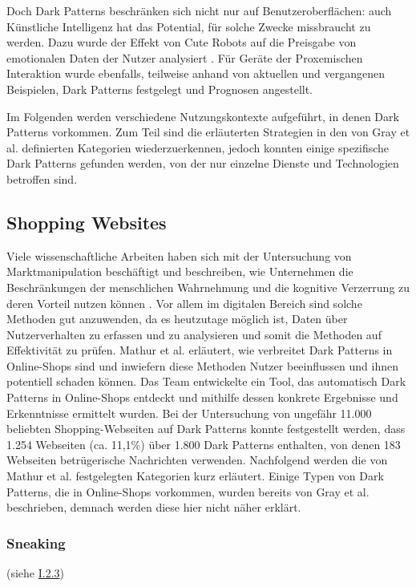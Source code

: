 \documentclass[a4paper]{article}
\begin{document}
Doch Dark Patterns beschränken sich nicht nur auf Benutzeroberflächen: auch Künstliche Intelligenz hat das Potential, für solche Zwecke missbraucht zu werden. Dazu wurde
der Effekt von \glqq Cute Robots\grqq{} auf die Preisgabe von emotionalen Daten der Nutzer analysiert \cite{lacey}. Für Geräte der Proxemischen Interaktion wurde ebenfalls, teilweise anhand von aktuellen und vergangenen Beispielen, Dark Patterns festgelegt und Prognosen angestellt.

Im Folgenden werden verschiedene Nutzungskontexte aufgeführt, in denen Dark Patterns vorkommen. Zum Teil sind die erläuterten Strategien in den von Gray et al. definierten Kategorien wiederzuerkennen, jedoch konnten einige spezifische Dark Patterns gefunden werden, von der nur einzelne Dienste und Technologien betroffen sind.


\subsection{Shopping Websites}
\label{sub:shopping}
Viele wissenschaftliche Arbeiten haben sich mit der Untersuchung von Marktmanipulation beschäftigt und beschreiben, wie Unternehmen die Beschränkungen der menschlichen Wahrnehmung und die kognitive Verzerrung zu deren Vorteil nutzen können \cite{mathur}\cite{narayanan}. Vor allem im digitalen Bereich sind solche Methoden gut anzuwenden, da es heutzutage möglich ist, Daten über Nutzerverhalten zu erfassen und zu analysieren und somit die Methoden auf Effektivität zu prüfen.\newline\newline
Mathur et al. erläutert, wie verbreitet Dark Patterns in Online-Shops sind und inwiefern diese Methoden Nutzer beeinflussen und ihnen potentiell schaden können. Das Team entwickelte ein Tool, das automatisch Dark Patterns in Online-Shops entdeckt und mithilfe dessen konkrete Ergebnisse und Erkenntnisse ermittelt wurden. Bei der Untersuchung von ungefähr 11.000 beliebten Shopping-Webseiten auf Dark Patterns konnte festgestellt werden, dass 1.254 Webseiten (ca. 11,1\%) über 1.800 Dark Patterns enthalten, von denen 183 Webseiten betrügerische Nachrichten verwenden.\newline\newline     
Nachfolgend werden die von Mathur et al. festgelegten Kategorien kurz erläutert. Einige Typen von Dark Patterns, die in Online-Shops vorkommen, wurden bereits von Gray et al. beschrieben, demnach werden diese hier nicht näher erklärt. 

\subsubsection{Sneaking}
\label{sssec:sneaking2}
(siehe \hyperref[sssec:sneaking]{I.2.3})
\end{document}

